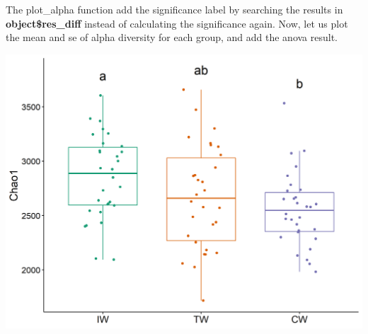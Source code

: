 \documentclass[
]{book}
\newenvironment{Shaded}{\begin{snugshade}}{\end{snugshade}}
\newcommand{\AttributeTok}[1]{\textcolor[rgb]{0.77,0.63,0.00}{#1}}
\newcommand{\ConstantTok}[1]{\textcolor[rgb]{0.00,0.00,0.00}{#1}}
\newcommand{\DecValTok}[1]{\textcolor[rgb]{0.00,0.00,0.81}{#1}}
\newcommand{\FunctionTok}[1]{\textcolor[rgb]{0.00,0.00,0.00}{#1}}
\newcommand{\NormalTok}[1]{#1}
\newcommand{\SpecialCharTok}[1]{\textcolor[rgb]{0.00,0.00,0.00}{#1}}
\newcommand{\StringTok}[1]{\textcolor[rgb]{0.31,0.60,0.02}{#1}}
\begin{document}
The plot\_alpha function add the significance label by searching the results in \textbf{object\$res\_diff} instead of calculating the significance again.
Now, let us plot the mean and se of alpha diversity for each group, and add the anova result.

\begin{Shaded}
\end{Shaded}

\begin{center}\includegraphics[width=600px]{Images/plot_alpha_letter} \end{center}

\begin{Shaded}
\end{Shaded}
\end{document}
